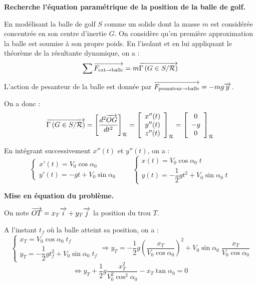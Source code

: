 \documentclass[10pt]{article}
\begin{document}
\textbf{Recherche l'équation paramétrique de la position de la balle de golf.}


En modélisant la balle de golf \textbf{$S$} comme un solide dont la masse $m$ est considérée concentrée en son centre d'inertie $G$. On considère qu'en première approximation la balle est soumise à son propre poids.%
En l'isolant et en lui appliquant le théorème de la résultante dynamique, on a :
$$
\sum \overrightarrow{F_{\text{ext}\rightarrow \text{balle}}} = m\overrightarrow{\Gamma \left( {G} \in {S}/{\mathcal{R}}\right)}
$$

L'action de pesanteur de la balle est donnée par $\overrightarrow{F_{\text{pesanteur}\rightarrow \text{balle}}} = -mg\overrightarrow{y}$.


On a donc :
$$\overrightarrow{\Gamma \left( {G} \in {S}/{\mathcal{R}}\right)} = \left[ \dfrac{d^2 \overrightarrow{OG}}{dt^2}\right]_{\mathcal{R}}
=\left[ \begin{array}{c}
x''(t) \\ y''(t) \\ z''(t)
\end{array}\right]_{\mathcal{R}}
=\left[ \begin{array}{c}
0 \\ -g \\ 0
\end{array}\right]_{\mathcal{R}}
$$

En intégrant successivement $x''(t)$ et $y''(t)$, on a : 
$$
\left\{ 
\begin{array}{l}
x'(t) =  V_0 \cos\alpha_0\\ 
y'(t) =  -gt +V_0 \sin\alpha_0
\end{array}
\right.
\quad
\quad
\left\{ 
\begin{array}{l}
x(t) = V_0 \cos\alpha_0 \; t \\ 
y(t) = -\dfrac{1}{2}gt^2 +  V_0 \sin\alpha_0 \; t
\end{array}
\right.
$$

\textbf{Mise en équation du problème.}


On note $\overrightarrow{OT}=x_T\overrightarrow{i} + y_T\overrightarrow{j}$ la position du trou $T$. 

A l'instant $t_f$ où la balle atteint sa position, on a : 
$$
\left\{ 
\begin{array}{l}
x_T = V_0 \cos\alpha_0 \; t_f \\ 
y_T = -\dfrac{1}{2}gt_f^2 +  V_0 \sin\alpha_0 \; t_f
\end{array}
\right.
\Longrightarrow 
y_T = -\dfrac{1}{2}g \left(\dfrac{x_T}{V_0 \cos\alpha_0}\right) ^2 + V_0 \sin\alpha_0 \; \dfrac{x_T}{V_0 \cos\alpha_0}
$$
$$
\Longleftrightarrow 
y_T+\dfrac{1}{2}g \dfrac{x_T^2}{V_0^2 \cos^2\alpha_0} - x_T \tan\alpha_0 = 0
$$
\end{document}
